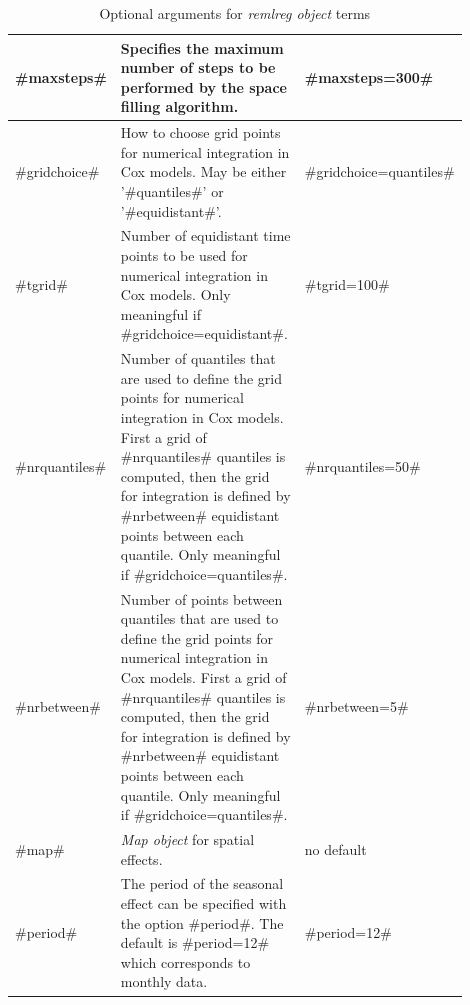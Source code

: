 \begin{table}[ht]
\begin{tabular}{|p{0.1\linewidth}|p{0.6\linewidth}|p{0.2\linewidth}|}
 \hline
 #maxsteps# & Specifies the maximum number of steps to be performed by the space filling algorithm. & #maxsteps=300#\\
 \hline
 #gridchoice# & How to choose grid points for numerical integration in Cox models. May be either '#quantiles#' or '#equidistant#'. & #gridchoice=quantiles# \\
 \hline
 #tgrid# & Number of equidistant time points to be used for numerical integration in Cox models. Only meaningful if #gridchoice=equidistant#. & #tgrid=100#\\
 \hline
 #nrquantiles# & Number of quantiles that are used to define the grid points for numerical integration in Cox models. First a grid of #nrquantiles# quantiles is computed, then the grid for integration is defined by #nrbetween# equidistant points between each quantile. Only meaningful if #gridchoice=quantiles#. & #nrquantiles=50#\\
 \hline
 #nrbetween# & Number of points between quantiles that are used to define the grid points for numerical integration in Cox models. First a grid of #nrquantiles# quantiles is computed, then the grid for integration is defined by #nrbetween# equidistant points between each quantile. Only meaningful if #gridchoice=quantiles#.& #nrbetween=5#\\
 \hline
 #map# & {\em Map object} for spatial effects. & no default\\
 \hline
 #period# & The period of the seasonal effect can be specified with the option #period#. The default is #period=12# which corresponds to monthly data. & #period=12# \\
 \hline
\end{tabular}
{\em \caption{\label{remlregoptions} Optional arguments for {\em
remlreg object} terms}}
\end{table}

